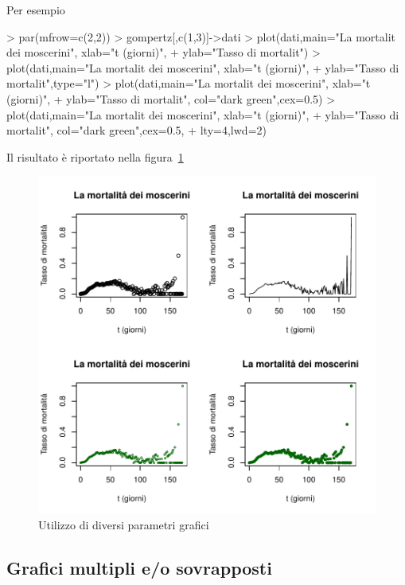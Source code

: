 \documentclass[onecolumn,11pt]{book}
\begin{document}
Per esempio
\begin{Schunk}
\begin{Sinput}
> par(mfrow=c(2,2))
> gompertz[,c(1,3)]->dati
> plot(dati,main="La mortalit dei moscerini", xlab="t (giorni)",
+ ylab="Tasso di mortalit")
> plot(dati,main="La mortalit dei moscerini", xlab="t (giorni)",
+ ylab="Tasso di mortalit",type="l")
> plot(dati,main="La mortalit dei moscerini", xlab="t (giorni)",
+ ylab="Tasso di mortalit", col="dark green",cex=0.5)
> plot(dati,main="La mortalit dei moscerini", xlab="t (giorni)",
+ ylab="Tasso di mortalit", col="dark green",cex=0.5,
+ lty=4,lwd=2)
\end{Sinput}
\end{Schunk}
Il risultato \`e riportato nella figura~\ref{4moscerini}
\begin{figure}\begin{center}
\includegraphics{statisticaconR-345}
\caption{Utilizzo di diversi parametri grafici}
\label{4moscerini}
\end{center}
\end{figure}





\subsection{Grafici multipli e/o sovrapposti}
\end{document}
